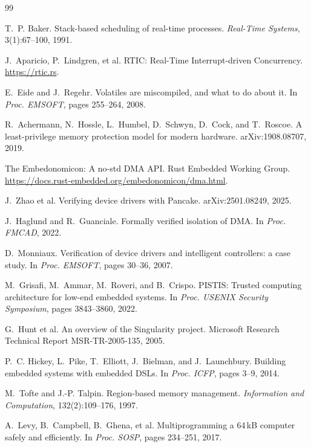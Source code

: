 \documentclass[10pt,twocolumn]{article}
\begin{document}
\begin{thebibliography}{99}
\footnotesize

 T.~P. Baker.
\newblock Stack-based scheduling of real-time processes.
\newblock \emph{Real-Time Systems}, 3(1):67--100, 1991.

 J.~Aparicio, P.~Lindgren, et al.
\newblock RTIC: Real-Time Interrupt-driven Concurrency.
\newblock \url{https://rtic.rs}.

 E.~Eide and J.~Regehr.
\newblock Volatiles are miscompiled, and what to do about it.
\newblock In \emph{Proc. EMSOFT}, pages 255--264, 2008.

 R.~Achermann, N.~Hossle, L.~Humbel, D.~Schwyn, D.~Cock,
and T.~Roscoe.
\newblock A least-privilege memory protection model for modern hardware.
\newblock arXiv:1908.08707, 2019.

 The Embedonomicon: A no-std DMA API.
\newblock Rust Embedded Working Group.
\newblock \url{https://docs.rust-embedded.org/embedonomicon/dma.html}.

 J.~Zhao et al.
\newblock Verifying device drivers with Pancake.
\newblock arXiv:2501.08249, 2025.

 J.~Haglund and R.~Guanciale.
\newblock Formally verified isolation of DMA.
\newblock In \emph{Proc. FMCAD}, 2022.

 D.~Monniaux.
\newblock Verification of device drivers and intelligent controllers: a case
study.
\newblock In \emph{Proc. EMSOFT}, pages 30--36, 2007.

 M.~Grisafi, M.~Ammar, M.~Roveri, and B.~Crispo.
\newblock PISTIS: Trusted computing architecture for low-end embedded systems.
\newblock In \emph{Proc. USENIX Security Symposium}, pages 3843--3860, 2022.

 G.~Hunt et al.
\newblock An overview of the Singularity project.
\newblock Microsoft Research Technical Report MSR-TR-2005-135, 2005.

 P.~C. Hickey, L.~Pike, T.~Elliott, J.~Bielman, and J.~Launchbury.
\newblock Building embedded systems with embedded DSLs.
\newblock In \emph{Proc. ICFP}, pages 3--9, 2014.

 M.~Tofte and J.-P. Talpin.
\newblock Region-based memory management.
\newblock \emph{Information and Computation}, 132(2):109--176, 1997.

 A.~Levy, B.~Campbell, B.~Ghena, et al.
\newblock Multiprogramming a 64\,kB computer safely and efficiently.
\newblock In \emph{Proc. SOSP}, pages 234--251, 2017.


\end{thebibliography}
\end{document}
